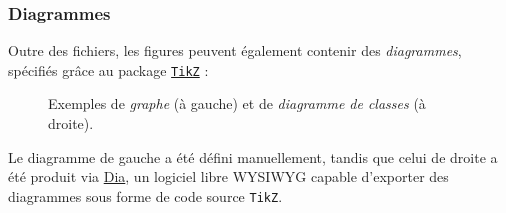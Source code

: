 \documentclass[10pt,    %
    french,             %
    xcolor=table,       %
    envcountsect,       %
    aspectratio=43      %
]{beamer}
\begin{document}
\begin{frame}
\end{frame}

\begin{frame}
    \frametitle{Diagrammes}
    Outre des fichiers, les figures peuvent également contenir des \textit{diagrammes}, spécifiés grâce au package \href{https://ctan.org/pkg/pgf?lang=en}{\texttt{TikZ}} :

    \vspace{-0.2cm}
    \begin{figure}[H]
        \centering
        \resizebox{0.35\linewidth}{!}{}
        \hspace{0.25cm}\hspace{0.25cm}
        \resizebox{0.45\linewidth}{!}{}
        \vspace{-0.3cm}
        \caption{Exemples de \textit{graphe} (à gauche) et de \textit{diagramme de classes} (à droite).}
        \label{fig:diagrams}
    \end{figure}
    
    \vspace{-0.6cm}
    Le diagramme de gauche a été défini manuellement, tandis que celui de droite a été produit via \href{http://dia-installer.de}{Dia}, un logiciel libre WYSIWYG capable d'exporter des diagrammes sous forme de code source \texttt{TikZ}.
    
    
\end{frame}
    
\end{document}
